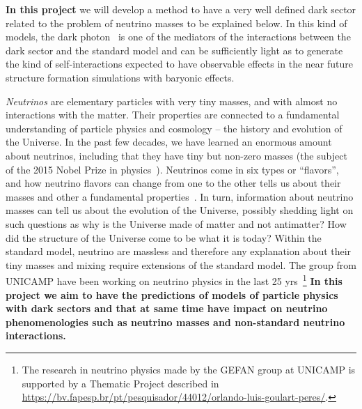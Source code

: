 \documentclass[a4paper,10pt,epsfig,epsf,amsfonts,amsmath]{article}
\begin{document}
\begin{ideas}
    
{\bf In this project} we will develop a method to have a very well defined
dark sector related to the problem of neutrino masses to be explained
below.
In this kind of models, the dark photon~\cite{Ren:2018gyx,She:2019skm} is one of the mediators of the
interactions between the dark sector and the standard model and can be
sufficiently light as to generate the kind of self-interactions
expected to have observable effects in the near future structure
formation simulations with baryonic effects.

\textit{Neutrinos} are elementary particles with very tiny masses, and
with almost no interactions with the matter.  Their properties are
connected to a fundamental understanding of particle physics and
cosmology -- the history and evolution of the Universe.
In the past few decades, we have learned an enormous amount
about neutrinos, including that they have tiny but non-zero masses
(the subject of the 2015 Nobel Prize in physics~\cite{premionobel2015a,premionobel2015b}).  Neutrinos come in
six types or ``flavors'', and how neutrino flavors can
change from one to the other tells us about their masses and other a
fundamental properties~\cite{GonzalezGarcia:2002dz}.  In turn, information about neutrino masses
can tell us about the evolution of the Universe, possibly shedding
light on such questions as  why is the Universe made of matter and not
antimatter? How did the structure of the Universe come to be what it
is today?
Within the standard model, neutrino are massless and therefore any
explanation about their tiny masses and mixing require extensions of
the standard model.  The group from UNICAMP have been working on neutrino physics in the last 25 yrs~\footnote{The research in neutrino physics made by the GEFAN group at UNICAMP  is supported by a Thematic Project described in  \href{https://bv.fapesp.br/pt/pesquisador/44012/orlando-luis-goulart-peres/}{https://bv.fapesp.br/pt/pesquisador/44012/orlando-luis-goulart-peres/}.} {\bf In this project we aim to have the predictions of models of particle physics with dark sectors and that at same time have impact on neutrino phenomenologies such as neutrino masses and non-standard neutrino interactions.}


\end{ideas}
\end{document}
